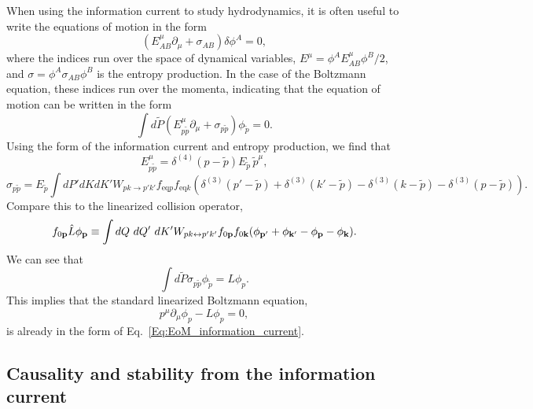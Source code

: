 \documentclass[aps,prd,preprint,nofootinbib,amsmath,amssymb,showpacs,longbibliography,singlecolumn,superscriptaddress,10pt]{revtex4-1}
\theoremstyle{plain}
\theoremstyle{definition}
\begin{document}
When using the information current to study hydrodynamics, it is often useful to write the equations of motion in the form 
\begin{equation}
    \left( E_{AB}^{\mu} \partial_{\mu} + \sigma_{AB} \right) \delta \phi^A = 0 ,
\end{equation}
where the indices run over the space of dynamical variables, $E^{\mu} = \phi^A E^{\mu}_{AB} \phi^B / 2$, and $\sigma = \phi^A \sigma_{AB} \phi^B$ is the entropy production. In the case of the Boltzmann equation, these indices run over the momenta, indicating that the equation of motion can be written in the form 
\begin{equation} \label{Eq:EoM_information_current}
    \int d\tilde{P} \left( E_{p\tilde{p}}^{\mu} \partial_{\mu} + \sigma_{p\tilde{p}} \right) \phi_{\tilde{p}} = 0 .
\end{equation}
Using the form of the information current and entropy production, we find that 
\begin{equation}
    E_{p\tilde{p}}^{\mu} = \delta^{(4)}(p-\tilde{p}) E_{\tilde{p}} \, \tilde{p}^{\mu} ,
\end{equation}
\begin{equation}
    \sigma_{p\tilde{p}} = E_{\tilde{p}} \int dP' dK dK' W_{pk\rightarrow p'k'} f_{\mathrm{eq}p} f_{\mathrm{eq}k} \left( \delta^{(3)}(p'-\tilde{p}) + \delta^{(3)}(k'-\tilde{p}) - \delta^{(3)}(k-\tilde{p}) - \delta^{(3)}(p-\tilde{p}) \right) .
\end{equation}
Compare this to the linearized collision operator,
%
%
\begin{equation}
\label{eq:lin-coll-term}
\begin{aligned}
f_{0\mathbf{p}} \hat{L}\phi_{\mathbf{p}}
\equiv
 \int dQ \ dQ^{\prime} \ dK^{\prime} W_{pk \leftrightarrow p'k'} 
f_{0\bf{p}} f_{0{\bf k}} 
(\phi_{\bf{p}'} + \phi_{\bf{k}'} -\phi_{\bf{p}} - \phi_{\bf{k}} ) .
\end{aligned}
\end{equation}
%
%
We can see that
\begin{equation}
    \int d\tilde{P} \sigma_{p\tilde{p}} \phi_{\tilde{p}} = L \phi_p . 
\end{equation}
This implies that the standard linearized Boltzmann equation, 
\begin{equation}
    p^{\mu} \partial_{\mu} \phi_p - L \phi_p = 0 ,
\end{equation}
is already in the form of Eq.\ \eqref{Eq:EoM_information_current}.

\subsection{Causality and stability from the information current}
\end{document}
